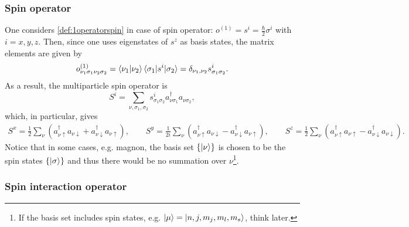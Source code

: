 \documentclass[a4paper,12pts]{article}
\numberwithin{equation}{section}
\begin{document}
	\subsubsection{Spin operator}
	One considers \ref{def:1operatorspin} in case of spin operator: $o^{(1)} = s^i = \frac{\hbar}{2}\sigma^i$ with $i=x,y,z$. Then, since one uses eigenstates of $s^z$ as basis states, the matrix elements are given by
	\begin{align}
	o^{(1)}_{\nu_1\sigma_1\nu_2\sigma_2} = \braket{\nu_1|\nu_2}\braket{\sigma_1|s^i|\sigma_2} = \delta_{\nu_1,\nu_2}s^i_{\sigma_1\sigma_2}.
	\end{align}
	As a result, the multiparticle spin operator is
	\begin{equation}
	\boxed{S^i = \sum_{\nu,\sigma_1,\sigma_2}s^i_{\sigma_1\sigma_2}a^{\dagger}_{\nu\sigma_1}a_{\nu\sigma_2}},
	\end{equation}
	which, in particular, gives
	\begin{align}
	S^x = \frac{1}{2} \sum_{\nu}\left(a^{\dagger}_{\nu\uparrow}a_{\nu\downarrow} + a^{\dagger}_{\nu\downarrow}a_{\nu\uparrow}\right),\qquad S^y = \frac{1}{2i} \sum_{\nu}\left(a^{\dagger}_{\nu\uparrow}a_{\nu\downarrow} - a^{\dagger}_{\nu\downarrow}a_{\nu\uparrow}\right),\qquad S^z = \frac{1}{2} \sum_{\nu}\left(a^{\dagger}_{\nu\uparrow}a_{\nu\uparrow} - a^{\dagger}_{\nu\downarrow}a_{\nu\downarrow}\right).
	\end{align}
	Notice that in some cases, e.g. magnon, the basis set $\{\ket{\nu}\}$ is chosen to be the spin states $\{\ket{\sigma}\}$ and thus there would be no summation over $\nu$\footnote{If the basis set includes spin states, e.g. $\ket{\mu}=\ket{n,j,m_j,m_l,m_s}$, think later.}.
	\subsubsection{Spin interaction operator}
	
\end{document}
